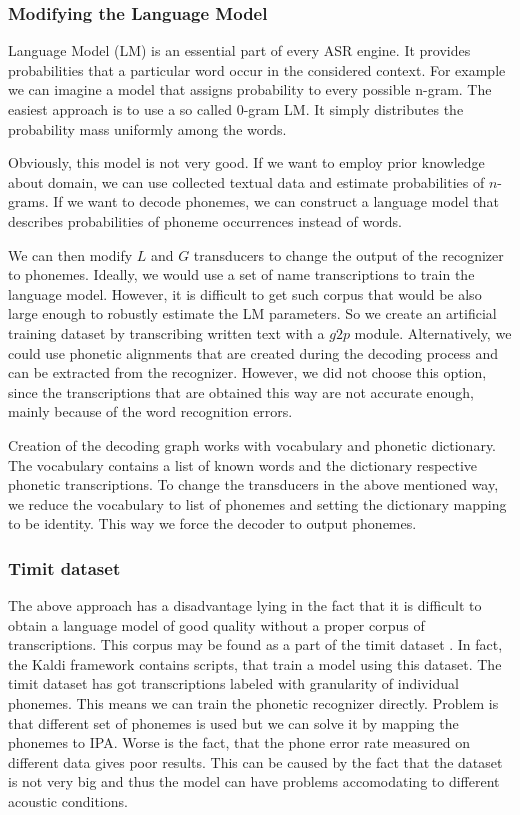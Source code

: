 \subsubsection{Modifying the Language Model}
Language Model (LM) is an essential part of every ASR engine.
It provides probabilities that a particular word occur in the considered context. 
For example we can imagine a model that assigns probability to every possible n-gram.
The easiest approach is to use a so called 0-gram LM.
It simply distributes the probability mass uniformly among the words.
\par
Obviously, this model is not very good.
If we want to employ prior knowledge about domain, we can use collected textual data and estimate probabilities of $n$-grams.
If we want to decode phonemes, we can construct a language model that describes probabilities of phoneme occurrences instead of words.
\par
We can then modify $L$ and $G$ transducers to change the output of the recognizer to phonemes.
Ideally, we would use a set of name transcriptions to train the language model.
However, it is difficult to get such corpus that would be also large enough to robustly estimate the LM parameters.
So we create an artificial training dataset by transcribing written text with a $g2p$ module.
Alternatively, we could use phonetic alignments that are created during the decoding process and can be extracted from the recognizer.
However, we did not choose this option, since the transcriptions that are obtained this way are not accurate enough, mainly because of the word recognition errors.
\par
Creation of the decoding graph works with vocabulary and phonetic dictionary.
The vocabulary contains a list of known words and the dictionary respective phonetic transcriptions. 
To change the transducers in the above mentioned way, we reduce the vocabulary to list of phonemes and setting the dictionary mapping to be identity.
This way we force the decoder to output phonemes.
\subsubsection{Timit dataset}
The above approach has a disadvantage lying in the fact that it is difficult to obtain a language model of good quality without a proper corpus of transcriptions.
This corpus may be found as a part of the timit dataset \cite{lopes2011phoneme}.
In fact, the Kaldi framework contains scripts, that train a model using this dataset.
The timit dataset has got transcriptions labeled with granularity of individual phonemes.
This means we can train the phonetic recognizer directly.
Problem is that different set of phonemes is used but we can solve it by mapping the phonemes to IPA.
Worse is the fact, that the phone error rate measured on different data gives poor results.
This can be caused by the fact that the dataset is not very big and thus the model can have problems accomodating to different acoustic conditions.  
